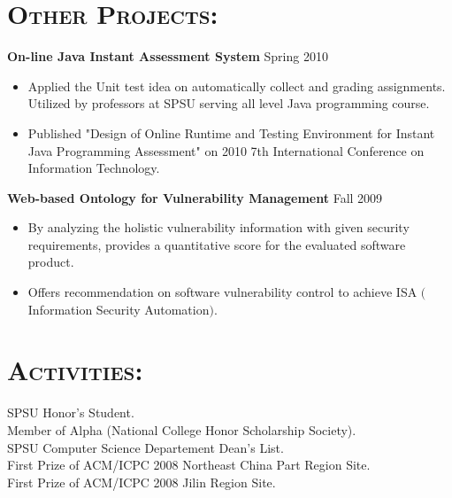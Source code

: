 \begin{resume}
\section{\textsc{Other Projects:}}
\textbf{\newline On-line Java Instant Assessment System} \hfill Spring 2010
\begin{itemize}
	\item Applied the Unit test idea on automatically collect and grading assignments. Utilized by professors at SPSU serving all level Java programming course.
	\item Published "Design of Online Runtime and Testing Environment for Instant Java Programming Assessment" on 2010 7th International Conference on Information Technology.
\end{itemize}

\textbf{Web-based Ontology for Vulnerability Management} \hfill Fall 2009
\begin{itemize}
	\item By analyzing the holistic vulnerability information with given security requirements, 
provides a quantitative score for the evaluated software product.
	\item Offers recommendation on software vulnerability control to achieve ISA $($Information
Security Automation$)$.
\end{itemize}



\section{\textsc{Activities:}} 
\textbf{\newline}
SPSU Honor’s Student. \\
Member of Alpha (National College Honor Scholarship Society).  \\
SPSU Computer Science Departement Dean's List.\\
First Prize of ACM/ICPC 2008 Northeast China Part Region Site.	\\
First Prize of ACM/ICPC 2008 Jilin Region Site. 





\end{resume}

